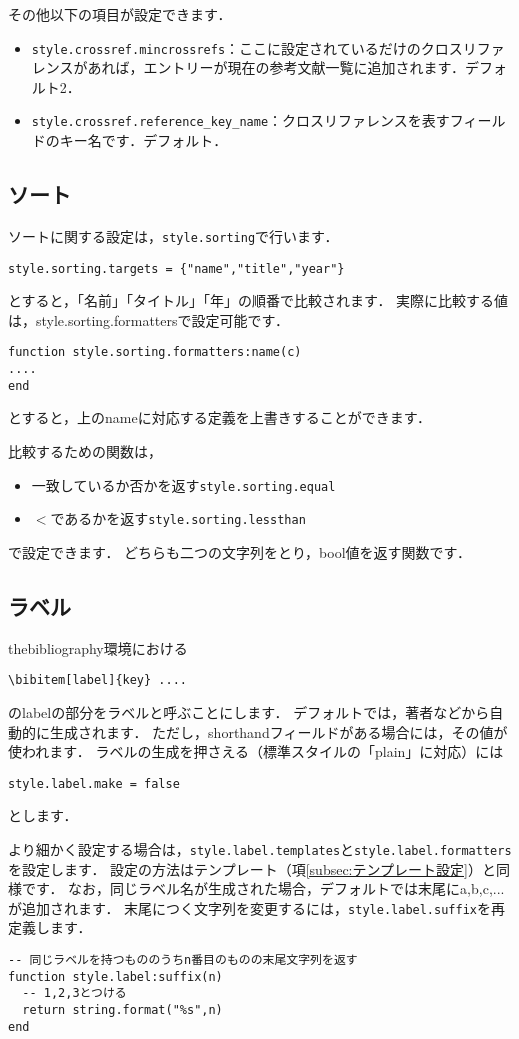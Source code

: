 \documentclass[a4paper,lualatex]{jlreq}
\makeatletter
\newcommand{\luafunc}[1]{\texttt{#1}}
\def\luastring{\@ifstar{\luastring@s}{\luastring@}}
\newcommand*{\luastring@s}[1]{``\texttt{#1}''}
\newcommand*{\luavar}[1]{\texttt{#1}}
\makeatother
\begin{document}
その他以下の項目が設定できます．
\begin{itemize}
\item \luavar{style.crossref.mincrossrefs}：ここに設定されているだけのクロスリファレンスがあれば，エントリーが現在の参考文献一覧に追加されます．デフォルト2．
\item \luavar{style.crossref.reference\_key\_name}：クロスリファレンスを表すフィールドのキー名です．デフォルト\luastring{crossref}．
\end{itemize}

\subsection{ソート}
ソートに関する設定は，\luavar{style.sorting}で行います．
\begin{lstlisting}
style.sorting.targets = {"name","title","year"}
\end{lstlisting}
とすると，「名前」「タイトル」「年」の順番で比較されます．
実際に比較する値は，style.sorting.formattersで設定可能です．
\begin{lstlisting}
function style.sorting.formatters:name(c)
....
end
\end{lstlisting}
とすると，上のnameに対応する定義を上書きすることができます．

比較するための関数は，
\begin{itemize}
\item 一致しているか否かを返す\luafunc{style.sorting.equal}
\item $<$であるかを返す\luafunc{style.sorting.lessthan}
\end{itemize}
で設定できます．
どちらも二つの文字列をとり，bool値を返す関数です．


\subsection{ラベル}
thebibliography環境における
\begin{lstlisting}[language={[latex]TeX}]
\bibitem[label]{key} ....
\end{lstlisting}
のlabelの部分をラベルと呼ぶことにします．
デフォルトでは，著者などから自動的に生成されます．
ただし，shorthandフィールドがある場合には，その値が使われます．
ラベルの生成を押さえる（標準スタイルの「plain」に対応）には
\begin{lstlisting}
style.label.make = false
\end{lstlisting}
とします．

より細かく設定する場合は，\luavar{style.label.templates}と\luavar{style.label.formatters}を設定します．
設定の方法はテンプレート（項\ref{subsec:テンプレート設定}）と同様です．
なお，同じラベル名が生成された場合，デフォルトでは末尾にa,b,c,...が追加されます．
末尾につく文字列を変更するには，\luavar{style.label.suffix}を再定義します．
\begin{lstlisting}
-- 同じラベルを持つもののうちn番目のものの末尾文字列を返す
function style.label:suffix(n)
  -- 1,2,3とつける
  return string.format("%s",n)
end
\end{lstlisting}
\end{document}
